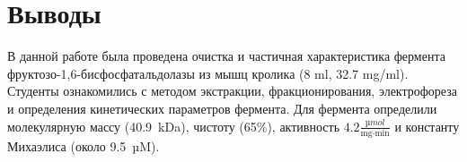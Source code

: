 \section{Выводы}
В данной работе была проведена очистка и частичная характеристика фермента
фруктозо-1,6-бисфосфатальдолазы из мышц кролика (8 ml, 32.7 mg/ml).
Студенты ознакомились с методом экстракции,
фракционирования, электрофореза и
определения кинетических параметров фермента.
Для фермента определили
молекулярную массу (40.9~kDa),
чистоту (65\%),
активность $4.2 \frac{µmol}{\text{mg} \cdot \text{min}}$ и
константу Михаэлиса (около 9.5~µM).

